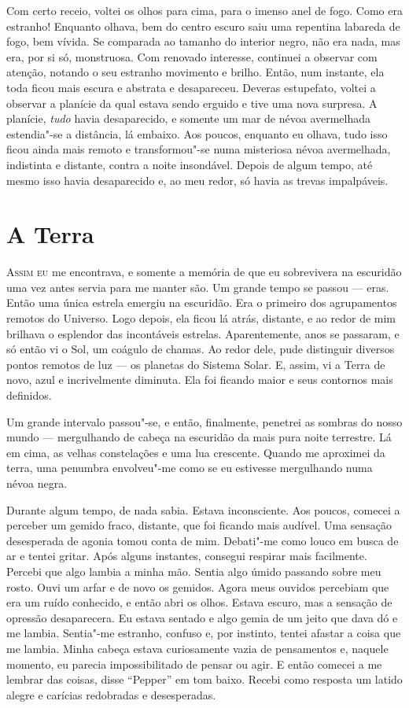Com certo receio, voltei os olhos para cima, para o imenso anel de fogo. Como era estranho! Enquanto olhava,
bem do centro escuro saiu uma repentina labareda de fogo, bem vívida. Se comparada ao tamanho do interior
negro, não era nada, mas era, por si só, monstruosa. Com renovado interesse, continuei a observar com atenção, notando
o seu estranho movimento e brilho. Então, num instante, ela toda ficou mais escura e abstrata e desapareceu. Deveras
estupefato, voltei a observar a planície da qual estava sendo erguido e tive uma nova surpresa. A planície,
\textit{tudo} havia desaparecido, e somente um mar de névoa avermelhada estendia"-se a distância, lá embaixo.
Aos poucos, enquanto eu olhava, tudo isso ficou ainda mais remoto e transformou"-se numa misteriosa névoa avermelhada,
indistinta e distante, contra a noite insondável. Depois de algum tempo, até mesmo isso havia desaparecido e, ao meu
redor, só havia as trevas impalpáveis. 


\clearpage

\chapter{A Terra}

\textsc{Assim eu} me encontrava, e somente a memória de que eu sobrevivera na escuridão uma vez antes servia para me manter são.
Um grande tempo se passou --- eras. Então uma única estrela emergiu na escuridão. Era o primeiro dos agrupamentos
remotos do Universo. Logo depois, ela ficou lá atrás, distante, e ao redor de mim brilhava o esplendor das incontáveis
estrelas. Aparentemente, anos se passaram, e só então vi o Sol, um coágulo de chamas. Ao redor dele, pude distinguir
diversos pontos remotos de luz --- os planetas do Sistema Solar. E, assim, vi a Terra de novo, azul e incrivelmente
diminuta. Ela foi ficando maior e seus contornos mais definidos.

Um grande intervalo passou"-se, e então, finalmente, penetrei as sombras do nosso mundo --- mergulhando de cabeça na
escuridão da mais pura noite terrestre. Lá em cima, as velhas constelações e uma lua crescente. Quando me aproximei da
terra, uma penumbra envolveu"-me como se eu estivesse mergulhando numa névoa negra.

Durante algum tempo, de nada sabia. Estava inconsciente. Aos poucos, comecei a perceber um gemido fraco, distante, que
foi ficando mais audível. Uma sensação desesperada de agonia tomou conta de mim. Debati"-me como louco em busca de ar e
tentei gritar. Após alguns instantes, consegui respirar mais facilmente. Percebi que algo lambia a minha mão. Sentia
algo úmido passando sobre meu rosto. Ouvi um arfar e de novo os gemidos. Agora meus ouvidos percebiam que era um
ruído conhecido, e então abri os olhos. Estava escuro, mas a sensação de opressão desaparecera. Eu estava sentado e
algo gemia de um jeito que dava dó e me lambia. Sentia"-me estranho, confuso e, por instinto, tentei afastar a coisa
que me lambia. Minha cabeça estava curiosamente vazia de pensamentos e, naquele momento, eu parecia impossibilitado de
pensar ou agir. E então comecei a me lembrar das coisas, disse “Pepper” em tom baixo.
Recebi como resposta um latido alegre e carícias redobradas e desesperadas.

